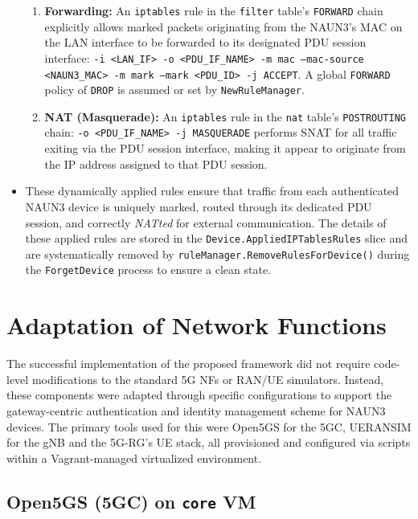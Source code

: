 \begin{itemize}
{\begin{enumerate}
            \item \textbf{Forwarding:} An \texttt{iptables} rule in the \texttt{filter} table's \texttt{FORWARD} chain explicitly allows marked packets originating from the \ac{NAUN3}'s \ac{MAC} on the \ac{LAN} interface to be forwarded to its designated \ac{PDU} session interface: \texttt{-i <LAN\_IF> -o <PDU\_IF\_NAME> -m mac --mac-source <NAUN3\_MAC> -m mark --mark <PDU\_ID> -j ACCEPT}. A global \texttt{FORWARD} policy of \texttt{DROP} is assumed or set by \texttt{NewRuleManager}.
            
            \item \textbf{\ac{NAT} (Masquerade):} An \texttt{iptables} rule in the \texttt{nat} table's \texttt{POSTROUTING} chain: \texttt{-o <PDU\_IF\_NAME> -j MASQUERADE} performs \ac{SNAT} for all traffic exiting via the \ac{PDU} session interface, making it appear to originate from the \ac{IP} address assigned to that \ac{PDU} session.
        \end{enumerate}
    }
    
    \item These dynamically applied rules ensure that traffic from each authenticated \ac{NAUN3} device is uniquely marked, routed through its dedicated \ac{PDU} session, and correctly \textit{NATted} for external communication. The details of these applied rules are stored in the \texttt{Device.AppliedIPTablesRules} slice and are systematically removed by \texttt{ruleManager.RemoveRulesForDevice()} during the \texttt{ForgetDevice} process to ensure a clean state.
    
\end{itemize}

\section{Adaptation of Network Functions}

The successful implementation of the proposed framework did not require code-level modifications to the standard \ac{5G} \acp{NF} or \ac{RAN}/\ac{UE} simulators. Instead, these components were adapted through specific configurations to support the gateway-centric authentication and identity management scheme for \ac{NAUN3} devices. The primary tools used for this were Open5GS for the \ac{5GC}, UERANSIM for the \ac{gNB} and the \ac{5G-RG}'s \ac{UE} stack, all provisioned and configured via scripts within a Vagrant-managed virtualized environment.

\subsection{Open5GS (\acs{5GC}) on \texttt{core} \acs{VM}}

